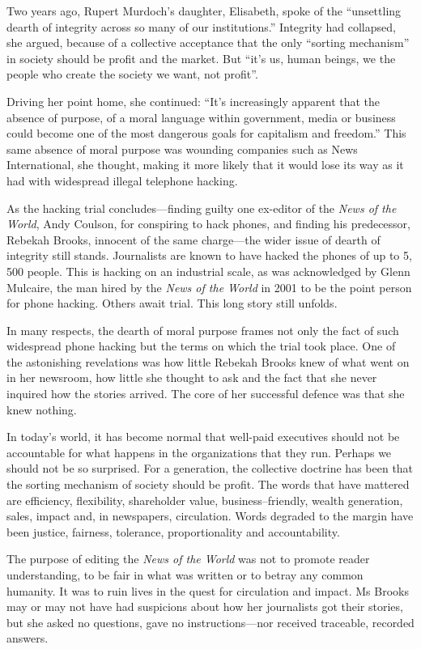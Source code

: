 Two years ago, Rupert Murdoch's daughter, Elisabeth, spoke of the
``unsettling dearth of integrity across so many of our institutions.''
Integrity had collapsed, she argued, because of a collective acceptance
that the only ``sorting mechanism'' in society should be profit and the
market. But ``it's us, human beings, we the people who create the
society we want, not profit''.

Driving her point home, she continued: ``It's increasingly apparent that
the absence of purpose, of a moral language within government, media or
business could become one of the most dangerous goals for capitalism and
freedom.'' This same absence of moral purpose was wounding companies
such as News International, she thought, making it more likely that it
would lose its way as it had with widespread illegal telephone hacking.

As the hacking trial concludes---finding guilty one ex-editor of
the \emph{News of the World}, Andy Coulson, for conspiring to hack
phones, and finding his predecessor, Rebekah Brooks, innocent of the
same charge---the wider issue of dearth of integrity still
stands. Journalists are known to have hacked the phones of up to 5, 500
people. This is hacking on an industrial scale, as was acknowledged by
Glenn Mulcaire, the man hired by the \emph{News of the World} in 2001 to
be the point person for phone hacking. Others await trial. This long
story still unfolds.

In many respects, the dearth of moral purpose frames not only the fact
of such widespread phone hacking but the terms on which the trial took
place. One of the astonishing revelations was how little Rebekah Brooks
knew of what went on in her newsroom, how little she thought to ask and
the fact that she never inquired how the stories arrived. The core of
her successful defence was that she knew nothing.

In today's world, it has become normal that well-paid executives should
not be accountable for what happens in the organizations that they run.
Perhaps we should not be so surprised. For a generation, the collective
doctrine has been that the sorting mechanism of society should be
profit. The words that have mattered are efficiency, flexibility,
shareholder value, business--friendly, wealth generation, sales, impact
and, in newspapers, circulation. Words degraded to the margin have been
justice, fairness, tolerance, proportionality and accountability.

The purpose of editing the \emph{News of the World} was not to promote reader
understanding, to be fair in what was written or to betray any common
humanity. It was to ruin lives in the quest for circulation and impact.
Ms Brooks may or may not have had suspicions about how her journalists
got their stories, but she asked no questions, gave no
instructions---nor received traceable, recorded answers.


